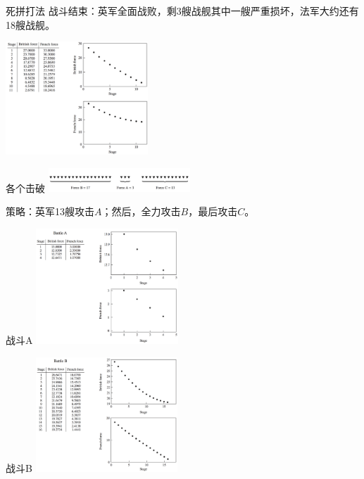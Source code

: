 \documentclass[
  ignorenonframetext,
]{ctexbeamer}
\begin{document}
\begin{frame}{死拼打法}
\label{ux6b7bux62fcux6253ux6cd5}
战斗结束：英军全面战败，剩3艘战舰其中一艘严重损坏，法军大约还有18艘战舰。

\includegraphics[width=0.4\textwidth,height=\textheight]{fight-death.png}
\end{frame}

\begin{frame}{各个击破}
\label{ux5404ux4e2aux51fbux7834}
\includegraphics[width=0.4\textwidth,height=\textheight]{fight-france.png}

策略：英军13艘攻击\(A\)；然后，全力攻击\(B\)，最后攻击\(C\)。
\end{frame}

\begin{frame}{战斗A}
\label{ux6218ux6597a}
\includegraphics[width=0.4\textwidth,height=\textheight]{fight-A.png}
\end{frame}

\begin{frame}{战斗B}
\label{ux6218ux6597b}
\includegraphics[width=0.4\textwidth,height=\textheight]{fight-B.png}
\end{frame}
\end{document}
